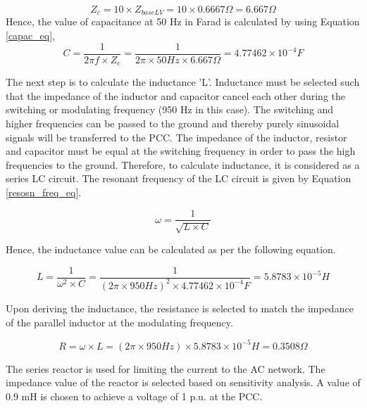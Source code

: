 \begin{equation}
    Z_c = 10 \times Z_{baseLV} = 10 \times 0.6667 \Omega = 6.667 \Omega   
\end{equation}
Hence, the value of capacitance at 50 Hz in Farad is calculated by using Equation \ref{capac_eq},
\begin{equation}\label{capac_eq}
    C = \frac{1}{2\pi f \times Z_c} = \frac{1}{2\pi \times 50 Hz \times 6.667\Omega} = 4.77462 \times 10^{-4} F
\end{equation}

The next step is to calculate the inductance 'L'. Inductance must be selected such that the impedance of the inductor and capacitor cancel each other during the switching or modulating frequency (950 Hz in this case). The switching and higher frequencies can be passed to the ground and thereby purely sinusoidal signals will be transferred to the \gls{PCC}. The impedance of the inductor, resistor and capacitor must be equal at the switching frequency in order to pass the high frequencies to the ground. Therefore, to calculate inductance, it is considered as a series LC circuit. The resonant frequency of the LC circuit is given by Equation \ref{resosn_freq_eq}.

\begin{equation}\label{resosn_freq_eq}
    \omega = \frac{1}{\sqrt{L \times C}}    
\end{equation}

Hence, the inductance value can be calculated as per the following equation.

\begin{equation}
    L = \frac{1}{\omega^2 \times C} = \frac{1}{(2\pi \times 950 Hz)^2 \times 4.77462 \times 10^{-4} F} = 5.8783 \times 10^{-5} H
\end{equation}

Upon deriving the inductance, the resistance is selected to match the impedance of the parallel inductor at the modulating frequency.

\begin{equation}
    R = \omega \times L = (2\pi \times 950 Hz) \times 5.8783 \times 10^{-5} H = 0.3508 \Omega
\end{equation}

The series reactor is used for limiting the current to the \gls{AC} network. The impedance value of the reactor is selected based on sensitivity analysis. A value of 0.9 mH is chosen to achieve a voltage of 1 p.u. at the \gls{PCC}.

